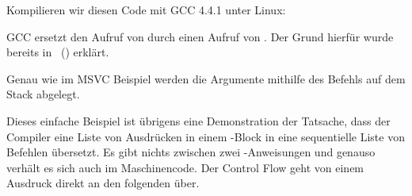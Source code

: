 
Kompilieren wir diesen Code mit GCC 4.4.1 unter Linux:



GCC ersetzt den Aufruf von \printf durch einen Aufruf von \puts. Der Grund hierfür wurde bereits in ~() erklärt.

% 
Genau wie im MSVC Beispiel werden die Argumente mithilfe des Befehls \MOV auf dem Stack abgelegt.

Dieses einfache Beispiel ist übrigens eine Demonstration der Tatsache, dass der Compiler eine Liste von Ausdrücken in einem
\CCpp-Block in eine sequentielle Liste von Befehlen übersetzt.
Es gibt nichts zwischen zwei \CCpp-Anweisungen und genauso verhält es sich auch im Maschinencode.
Der Control Flow geht von einem Ausdruck direkt an den folgenden über.
